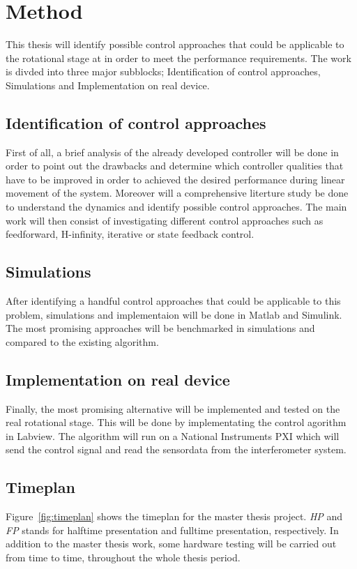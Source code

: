 \chapter{Method}\label{cha:method}
This thesis will identify possible control approaches that could be applicable to the rotational stage at \abbrCERN in order to meet the performance requirements. The work is divded into three major subblocks; Identification of control approaches, Simulations and Implementation on real device.


\section{Identification of control approaches}
First of all, a brief analysis of the already developed controller will be done in order to point out the drawbacks and determine which controller qualities that have to be improved in order to achieved the desired performance during linear movement of the system. Moreover will a comprehensive literture study be done to understand the dynamics and identify possible control approaches. The main work will then consist of investigating different control approaches such as feedforward, H-infinity, iterative or state feedback control.

\section{Simulations}
After identifying a handful control approaches that could be applicable to this problem, simulations and implementaion will be done in Matlab and Simulink. The most promising approaches will be benchmarked in simulations and compared to the existing algorithm.

\section{Implementation on real device}
Finally, the most promising alternative will be implemented and tested on the real rotational stage. This will be done by implementating the control agorithm in Labview. The algorithm will run on a National Instruments PXI which will send the control signal and read the sensordata from the interferometer system.

\section{Timeplan}
Figure~\ref{fig:timeplan} shows the timeplan for the master thesis project. \emph{HP} and \emph{FP} stands for halftime presentation and fulltime presentation, respectively. In addition to the master thesis work, some hardware testing will be carried out from time to time, throughout the whole thesis period.

